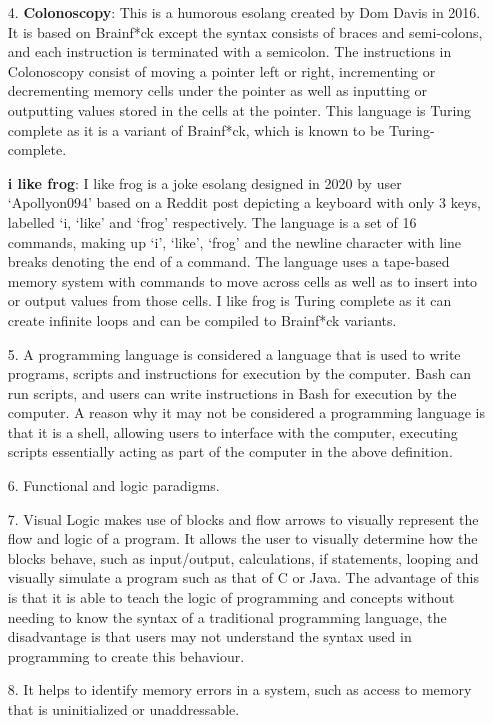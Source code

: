 \documentclass{article}
\begin{document}
\begin{enumerate}
  \item[4.] \textbf{Colonoscopy}: This is a humorous esolang created by Dom Davis in 2016. It is based on Brainf*ck except the syntax consists of braces and semi-colons, and each instruction is terminated with a semicolon. The instructions in Colonoscopy consist of moving a pointer left or right, incrementing or decrementing memory cells under the pointer as well as inputting or outputting values stored in the cells at the pointer. This language is Turing complete as it is a variant of Brainf*ck, which is known to be Turing-complete.\cite{colonoscopy-esolang}
  
  \textbf{i like frog}: I like frog is a joke esolang designed in 2020 by user `Apollyon094' based on a Reddit post depicting a keyboard with only 3 keys, labelled `i, `like' and `frog' respectively. The language is a set of 16 commands, making up `i', `like', `frog' and the newline character with line breaks denoting the end of a command. The language uses a tape-based memory system with commands to move across cells as well as to insert into or output values from those cells. I like frog is Turing complete as it can create infinite loops and can be compiled to Brainf*ck variants.\cite{i-like-frog-esolang}
  
  \item[5.] A programming language is considered a language that is used to write programs, scripts and instructions for execution by the computer.\cite{programming-language} Bash can run scripts, and users can write instructions in Bash for execution by the computer. A reason why it may not be considered a programming language is that it is a shell, allowing users to interface with the computer, executing scripts essentially acting as part of the computer in the above definition.\cite{what-is-shell}
  
  \item[6.] Functional and logic paradigms.\cite{alf-paradigm}
  
  \item[7.] Visual Logic makes use of blocks and flow arrows to visually represent the flow and logic of a program. It allows the user to visually determine how the blocks behave, such as input/output, calculations, if statements, looping and visually simulate a program such as that of C or Java.\cite{visual-logic} The advantage of this is that it is able to teach the logic of programming and concepts without needing to know the syntax of a traditional programming language, the disadvantage is that users may not understand the syntax used in programming to create this behaviour.
  
  \item[8.] It helps to identify memory errors in a system, such as access to memory that is uninitialized or unaddressable.\cite{drmemory}
\end{enumerate}



\end{document}
